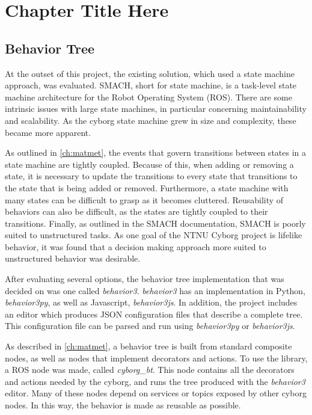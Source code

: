 \documentclass[\rootfolder/main.tex]{subfiles}
\begin{document}
\chapter{Chapter Title Here} %

\label{ch:foo} %

\section{Behavior Tree}

At the outset of this project, the existing solution, which used a state machine approach, was evaluated.
SMACH, short for state machine, is a task-level state machine architecture for the Robot Operating System (ROS).
There are some intrinsic issues with large state machines, in particular concerning maintainability and scalability.
As the cyborg state machine grew in size and complexity, these became more apparent.

As outlined in \cref{ch:matmet}, the events that govern transitions between states in a state machine are tightly coupled.
Because of this, when adding or removing a state, it is necessary to update the transitions to every state that transitions to the state that is being added or removed.
Furthermore, a state machine with many states can be difficult to grasp as it becomes cluttered.
Reusability of behaviors can also be difficult, as the states are tightly coupled to their transitions.
Finally, as outlined in the SMACH documentation, SMACH is poorly suited to unstructured tasks.
As one goal of the NTNU Cyborg project is lifelike behavior, it was found that a decision making approach more suited to unstructured behavior was desirable.

After evaluating several options, the behavior tree implementation that was decided on was one called \emph{behavior3}.
\emph{behavior3} has an implementation in Python, \emph{behavior3py}, as well as Javascript, \emph{behavior3js}.
In addition, the project includes an editor which produces JSON configuration files that describe a complete tree. 
This configuration file can be parsed and run using \emph{behavior3py} or \emph{behavior3js}.

As described in \cref{ch:matmet}, a behavior tree is built from standard composite nodes, as well as nodes that implement decorators and actions.
To use the library, a ROS node was made, called \emph{cyborg\_bt}. 
This node contains all the decorators and actions needed by the cyborg, and runs the tree produced with the \emph{behavior3} editor.
Many of these nodes depend on services or topics exposed by other cyborg nodes.
In this way, the behavior is made as reusable as possible.
\end{document}
